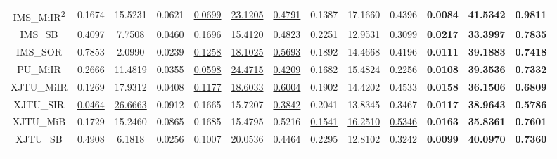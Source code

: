 \documentclass[UTF8,lettersize,journal]{IEEEtran}
\begin{document}
\begin{table}[t!]
\begin{tabular}{c|c c c|c c c|c c c|c c c}
		IMS\_MiIR\textsuperscript{2}  & 0.1674 & 15.5231 & 0.0621 & \underline{0.0699} & \underline{23.1205} & \underline{0.4791} & 0.1387 & 17.1660 & 0.4396 & \textbf{0.0084} & \textbf{41.5342} & \textbf{0.9811}
		\\
		\noalign{\vspace{2.8pt}}\hline\noalign{\smallskip}
		IMS\_SB  & 0.4097 & 7.7508 & 0.0460 & \underline{0.1696} & \underline{15.4120} & \underline{0.4823} & 0.2251 & 12.9531 & 0.3099 & \textbf{0.0217} & \textbf{33.3997} & \textbf{0.7835}
		\\
		\noalign{\vspace{2.8pt}}\hline\noalign{\smallskip}
		IMS\_SOR  & 0.7853 & 2.0990 & 0.0239 & \underline{0.1258} & \underline{18.1025} & \underline{0.5693} & 0.1892 & 14.4668 & 0.4196 & \textbf{0.0111} & \textbf{39.1883} & \textbf{0.7418} 
		\\
		\noalign{\vspace{2.8pt}}\hline\noalign{\smallskip}
		PU\_MiIR   & 0.2666 & 11.4819 & 0.0355 & \underline{0.0598} & \underline{24.4715} & \underline{0.4209} & 0.1682 & 15.4824 & 0.2256 & \textbf{0.0108} & \textbf{39.3536} & \textbf{0.7332}
		\\
		\noalign{\vspace{2.8pt}}\hline\noalign{\smallskip}
		XJTU\_MiIR & 0.1269 & 17.9312 & 0.0408 & \underline{0.1177} & \underline{18.6033} & \underline{0.6004} & 0.1902 & 14.4202 & 0.4533 & \textbf{0.0158} & \textbf{36.1506} & \textbf{0.6809}
		\\
		\noalign{\vspace{2.8pt}}\hline\noalign{\smallskip}
		XJTU\_SIR & \underline{0.0464} & \underline{26.6663} & 0.0912 & 0.1665 & 15.7207 & \underline{0.3842} & 0.2041 & 13.8345 & 0.3467 & \textbf{0.0117} & \textbf{38.9643} & \textbf{0.5786}
		\\
		\noalign{\vspace{2.8pt}}\hline\noalign{\smallskip}
		XJTU\_MiB & 0.1729 & 15.2460 & 0.0865 & 0.1685 & 15.4795 & 0.5216 & \underline{0.1541} & \underline{16.2510} & \underline{0.5346} & \textbf{0.0163} & \textbf{35.8361} & \textbf{0.7601} 
		\\
		\noalign{\vspace{2.8pt}}\hline\noalign{\smallskip}
		XJTU\_SB & 0.4908 & 6.1818 & 0.0256 & \underline{0.1007} & \underline{20.0536} & \underline{0.4464} & 0.2295 & 12.8102 & 0.3242 & \textbf{0.0099} & \textbf{40.0970} & \textbf{0.7360}
		\\
		\noalign{\vspace{2.8pt}}\hline\noalign{\smallskip}

\end{tabular}
\end{table}
\end{document}
